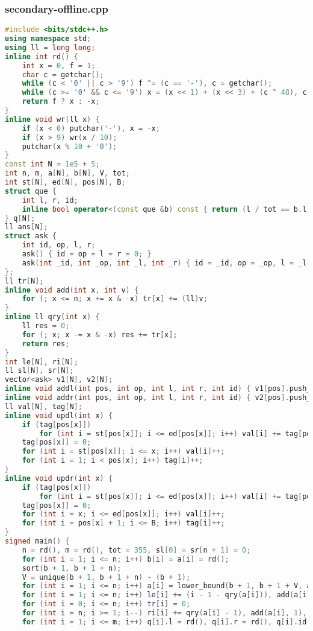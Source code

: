 \documentclass[9pt, a4paper, oneside]{book}
\begin{document}
\subsubsection{secondary-offline.cpp}
\begin{lstlisting}[language={C++}]
#include <bits/stdc++.h>
using namespace std;
using ll = long long;
inline int rd() {
    int x = 0, f = 1;
    char c = getchar();
    while (c < '0' || c > '9') f ^= (c == '-'), c = getchar();
    while (c >= '0' && c <= '9') x = (x << 1) + (x << 3) + (c ^ 48), c = getchar();
    return f ? x : -x;
}
inline void wr(ll x) {
    if (x < 0) putchar('-'), x = -x;
    if (x > 9) wr(x / 10);
    putchar(x % 10 + '0');
}
const int N = 1e5 + 5;
int n, m, a[N], b[N], V, tot;
int st[N], ed[N], pos[N], B;
struct que {
    int l, r, id;
    inline bool operator<(const que &b) const { return (l / tot == b.l / tot) ? r < b.r : l < b.l; }
} q[N];
ll ans[N];
struct ask {
    int id, op, l, r;
    ask() { id = op = l = r = 0; }
    ask(int _id, int _op, int _l, int _r) { id = _id, op = _op, l = _l, r = _r; }
};
ll tr[N];
inline void add(int x, int v) {
    for (; x <= n; x += x & -x) tr[x] += (ll)v;
}
inline ll qry(int x) {
    ll res = 0;
    for (; x; x -= x & -x) res += tr[x];
    return res;
}
int le[N], ri[N];
ll sl[N], sr[N];
vector<ask> v1[N], v2[N];
inline void addl(int pos, int op, int l, int r, int id) { v1[pos].push_back(ask(id, op, l, r)); }
inline void addr(int pos, int op, int l, int r, int id) { v2[pos].push_back(ask(id, op, l, r)); }
ll val[N], tag[N];
inline void updl(int x) {
    if (tag[pos[x]])
        for (int i = st[pos[x]]; i <= ed[pos[x]]; i++) val[i] += tag[pos[x]];
    tag[pos[x]] = 0;
    for (int i = st[pos[x]]; i <= x; i++) val[i]++;
    for (int i = 1; i < pos[x]; i++) tag[i]++;
}
inline void updr(int x) {
    if (tag[pos[x]])
        for (int i = st[pos[x]]; i <= ed[pos[x]]; i++) val[i] += tag[pos[x]];
    tag[pos[x]] = 0;
    for (int i = x; i <= ed[pos[x]]; i++) val[i]++;
    for (int i = pos[x] + 1; i <= B; i++) tag[i]++;
}
signed main() {
    n = rd(), m = rd(), tot = 355, sl[0] = sr[n + 1] = 0;
    for (int i = 1; i <= n; i++) b[i] = a[i] = rd();
    sort(b + 1, b + 1 + n);
    V = unique(b + 1, b + 1 + n) - (b + 1);
    for (int i = 1; i <= n; i++) a[i] = lower_bound(b + 1, b + 1 + V, a[i]) - b;
    for (int i = 1; i <= n; i++) le[i] += (i - 1 - qry(a[i])), add(a[i], 1), sl[i] = sl[i - 1] + le[i];
    for (int i = 0; i <= n; i++) tr[i] = 0;
    for (int i = n; i >= 1; i--) ri[i] += qry(a[i] - 1), add(a[i], 1), sr[i] = sr[i + 1] + ri[i];
    for (int i = 1; i <= m; i++) q[i].l = rd(), q[i].r = rd(), q[i].id = i;

\end{lstlisting}
\end{document}

